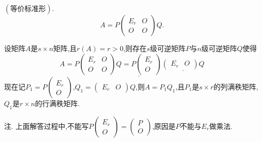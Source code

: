 \documentclass{article}
\begin{document}
 $\left(\text{等价标准形}\right)$. 
\begin{equation*}
    A = P \left(
    \begin{array}{cc}
        E_r & O \\
        O   & O
    \end{array}
    \right)Q.
\end{equation*}

 

 设矩阵$A$是$s \times n$矩阵,且$r \left(A\right) = r > 0$,则存在$s$级可逆矩阵$P$与$n$级可逆矩阵$Q$使得
\begin{equation*}
    A=P\left(\begin{array}{cc}
            E_{r} & O \\
            O     & O
        \end{array}\right)
    \underline{Q=P\left(\begin{array}{c}
            E_{r} \\
            O
        \end{array}\right)}
    \underline{\left(\begin{array}{ll}
            E_{r} & O
        \end{array}\right) Q}
\end{equation*}
现在记$P_1 = P \left(
    \begin{array}{c}
            E_r \\
            O
        \end{array}
    \right)$,$Q_1 = \left(
    \begin{array}{cc}
            E_r & O
        \end{array}
    \right)Q$,则$A = P_1Q_1$,且$P_1$是$s \times r$的列满秩矩阵,$Q_1$是$r \times n$的行满秩矩阵.

注. 上面解答过程中,不能写$P \left(
    \begin{array}{c}
            E_r \\
            O
        \end{array}
    \right)
    =
    \left(
    \begin{array}{c}
            P \\
            O
        \end{array}
    \right)$,原因是$P$不能与$E_r$做乘法.

\end{document}
